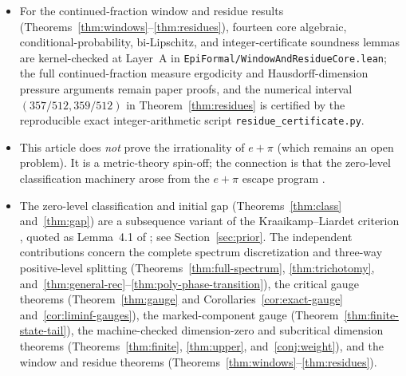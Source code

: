 \documentclass[11pt]{article}
\theoremstyle{definition}
\theoremstyle{remark}
\newcommand{\R}{\mathbb{R}}
\newcommand{\Z}{\mathbb{Z}}
\begin{document}
\begin{itemize}[leftmargin=1.5em]
Theorem~\ref{thm:gauge} and Remark~\ref{rem:gauge-scale}, constructively proves
open-interval and open-arc $\mathcal H^{h_k}$-infinitude
(Corollary~\ref{cor:exact-gauge}(i) on $\R$ and \texttt{UnitAddCircle}), and
verifies the binary Cantor-tree positivity, $\mathcal H^{g_2}$-infinitude on
every nonempty open subset of $\R/\Z$, $\sigma$-finiteness,
$\mathcal H^{h_k}$-nullity, and $g_\beta$ threshold dichotomy for
$E_{\mathrm{lim}}(k/4)$ in Theorem~\ref{thm:trichotomy}(ii).
\item For the continued-fraction window and residue results
(Theorems~\ref{thm:windows}--\ref{thm:residues}), fourteen core algebraic,
conditional-probability, bi-Lipschitz, and integer-certificate soundness lemmas
are kernel-checked at Layer~A in
\texttt{EpiFormal/\allowbreak{}Window\allowbreak{}And\allowbreak{}Residue\allowbreak{}Core.lean};
the full continued-fraction measure ergodicity and Hausdorff-dimension pressure
arguments remain paper proofs, and the numerical interval $(357/512,359/512)$ in
Theorem~\ref{thm:residues} is certified by the reproducible exact
integer-arithmetic script \texttt{residue\_certificate.py}.
\item This article does \emph{not} prove the irrationality of $e+\pi$ (which
remains an open problem). It is a metric-theory spin-off; the connection is
that the zero-level classification machinery arose from the $e+\pi$ escape
program \cite{Phase1}.
\item The zero-level classification and initial gap (Theorems~\ref{thm:class}
and~\ref{thm:gap}) are a subsequence variant of the Kraaikamp--Liardet
criterion \cite{KL}, quoted as Lemma~4.1 of \cite{BDS}; see
Section~\ref{sec:prior}. The independent contributions concern the complete spectrum
discretization and three-way positive-level splitting
(Theorems~\ref{thm:full-spectrum}, \ref{thm:trichotomy},
and~\ref{thm:general-rec}--\ref{thm:poly-phase-transition}), the critical gauge theorems
(Theorem~\ref{thm:gauge} and Corollaries~\ref{cor:exact-gauge}
and~\ref{cor:liminf-gauges}), the marked-component gauge
(Theorem~\ref{thm:finite-state-tail}), the machine-checked dimension-zero and subcritical dimension theorems
(Theorems~\ref{thm:finite}, \ref{thm:upper}, and~\ref{conj:weight}), and the
window and residue theorems (Theorems~\ref{thm:windows}--\ref{thm:residues}).
\end{itemize}
\end{document}

